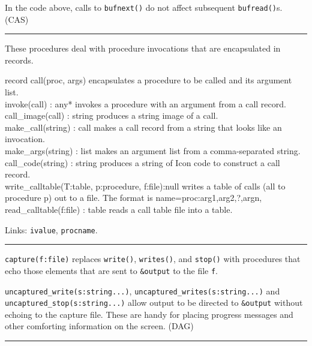 In the code above, calls to \texttt{bufnext()} do not affect subsequent
\texttt{bufread()}{\textquotesingle}s. (CAS)

\vspace{0.25cm}\hrule{}

These procedures deal with procedure
invocations that are encapsulated in records.

\textsf{record call(proc, args)} encapsulates a procedure to be called
and its argument list.\\
\textsf{invoke(call) : any*} invokes a procedure with an argument from a
call record.\\
\textsf{call\_image(call) : string} produces a string image of a
call.\\
\textsf{make\_call(string) : call} makes a call record from a string
that looks like an invocation.\\
\textsf{make\_args(string) : list} makes an argument list from a
comma-separated string.\\
\textsf{call\_code(string) : string} produces a string of Icon code to
construct a call record.\\
\textsf{write\_calltable(T:table, p:procedure, f:file):null} writes a
table of calls (all to procedure p) out to a file. The format is
\textsf{name=proc:arg1,arg2,?,argn,}\\
\textsf{read\_calltable(f:file) : table} reads a call table file into a
table.

Links: \texttt{ivalue}, \texttt{procname}. 

\vspace{0.25cm}\hrule{}

\texttt{capture(f:file)} replaces \texttt{write()}, \texttt{writes()},
and \texttt{stop()} with procedures that echo those elements that are
sent to \texttt{\&output} to the file \texttt{f}.

\texttt{uncaptured\_write(s:string...)},
\texttt{uncaptured\_writes(s:string...)} and \linebreak
\texttt{uncaptured\_stop(s:string...)} allow output to be directed to
\texttt{\&output} without echoing to the capture file. These are handy
for placing progress messages and other comforting information on the
screen. (DAG)

\vspace{0.25cm}\hrule{}

